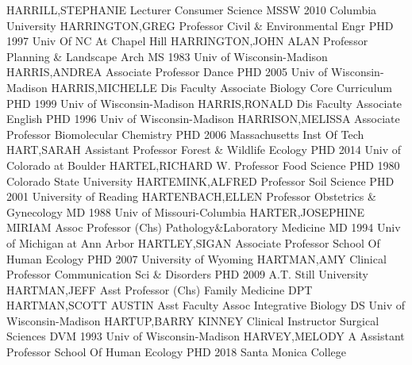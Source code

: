 \documentclass[
]{article}
\begin{document}
\textbar{}  \textbar HARRILL,STEPHANIE \textbar Lecturer
\textbar Consumer Science \textbar MSSW 2010 Columbia University
\textbar{}  \textbar HARRINGTON,GREG \textbar Professor
\textbar Civil \& Environmental Engr \textbar PHD 1997 Univ Of NC At
Chapel Hill \textbar{}  \textbar HARRINGTON,JOHN ALAN
\textbar Professor \textbar Planning \& Landscape Arch \textbar MS 1983
Univ of Wisconsin-Madison \textbar{}  \textbar HARRIS,ANDREA
\textbar Associate Professor \textbar Dance \textbar PHD 2005 Univ of
Wisconsin-Madison \textbar{}  \textbar HARRIS,MICHELLE
\textbar Dis Faculty Associate \textbar Biology Core Curriculum
\textbar PHD 1999 Univ of Wisconsin-Madison \textbar{} 
\textbar HARRIS,RONALD \textbar Dis Faculty Associate \textbar English
\textbar PHD 1996 Univ of Wisconsin-Madison \textbar{} 
\textbar HARRISON,MELISSA \textbar Associate Professor
\textbar Biomolecular Chemistry \textbar PHD 2006 Massachusetts Inst Of
Tech \textbar{}  \textbar HART,SARAH \textbar Assistant
Professor \textbar Forest \& Wildlife Ecology \textbar PHD 2014 Univ of
Colorado at Boulder \textbar{}  \textbar HARTEL,RICHARD W.
\textbar Professor \textbar Food Science \textbar PHD 1980 Colorado
State University \textbar{}  \textbar HARTEMINK,ALFRED
\textbar Professor \textbar Soil Science \textbar PHD 2001 University of
Reading \textbar{}  \textbar HARTENBACH,ELLEN
\textbar Professor \textbar Obstetrics \& Gynecology \textbar MD 1988
Univ of Missouri-Columbia \textbar{} 
\textbar HARTER,JOSEPHINE MIRIAM \textbar Assoc Professor (Chs)
\textbar Pathology\&Laboratory Medicine \textbar MD 1994 Univ of
Michigan at Ann Arbor \textbar{}  \textbar HARTLEY,SIGAN
\textbar Associate Professor \textbar School Of Human Ecology
\textbar PHD 2007 University of Wyoming \textbar{} 
\textbar HARTMAN,AMY \textbar Clinical Professor \textbar Communication
Sci \& Disorders \textbar PHD 2009 A.T. Still University \textbar{}
 \textbar HARTMAN,JEFF \textbar Asst Professor (Chs)
\textbar Family Medicine \textbar DPT \textbar{} 
\textbar HARTMAN,SCOTT AUSTIN \textbar Asst Faculty Assoc
\textbar Integrative Biology \textbar DS Univ of Wisconsin-Madison
\textbar{}  \textbar HARTUP,BARRY KINNEY \textbar Clinical
Instructor \textbar Surgical Sciences \textbar DVM 1993 Univ of
Wisconsin-Madison \textbar{}  \textbar HARVEY,MELODY A
\textbar Assistant Professor \textbar School Of Human Ecology
\textbar PHD 2018 Santa Monica College \textbar{} 
\end{document}
